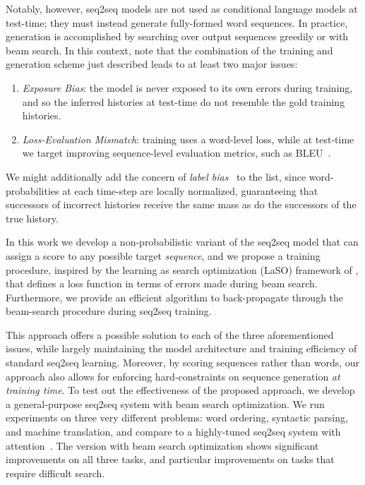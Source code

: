 \documentclass[11pt,letterpaper]{article}
\begin{document}
Notably, however, seq2seq models are not used as conditional language
models at test-time; they must instead generate fully-formed word sequences. In practice, generation is accomplished by searching over output sequences greedily or with beam search. In this context, 
note that the combination of the training and generation scheme just described leads to at least two major issues:

\begin{enumerate}
\item \textit{Exposure Bias}: the model is never exposed to its own
  errors during training, and so the inferred histories at test-time
  do not resemble the gold training histories.
\item \textit{Loss-Evaluation Mismatch}: training uses a word-level
  loss, while at test-time we target improving sequence-level
  evaluation metrics, such as BLEU~\cite{papineni02bleu}.
\end{enumerate}

We might additionally add the concern of \textit{label bias}~\cite{lafferty01conditional}
to the list, since word-probabilities at each time-step are locally
normalized, guaranteeing that successors of incorrect histories receive
the same mass as do the successors of the true history.

In this work we develop a non-probabilistic variant of the seq2seq
model that can assign a score to any possible target
\textit{sequence}, and we propose a training procedure, inspired by the learning
as search optimization (LaSO) framework of ,
that defines a loss function in terms of errors made during beam
search. Furthermore, we provide an efficient algorithm to
back-propagate through the beam-search procedure during seq2seq
training.

This approach offers a possible solution to each of the three
aforementioned issues, while largely maintaining the model architecture and
training efficiency of standard seq2seq learning. Moreover, by scoring sequences rather than words, our approach also allows for enforcing hard-constraints on sequence generation \textit{at training time}. To test out the effectiveness of the proposed approach, we develop a general-purpose seq2seq system with beam
search optimization. We run experiments on three very different
problems: word ordering, syntactic parsing, and machine
translation, and compare to a highly-tuned seq2seq system with
attention~\cite{luong15effective}. The version with beam search optimization shows
significant improvements on all three tasks, and particular
improvements on tasks that require difficult search. 
\end{document}
